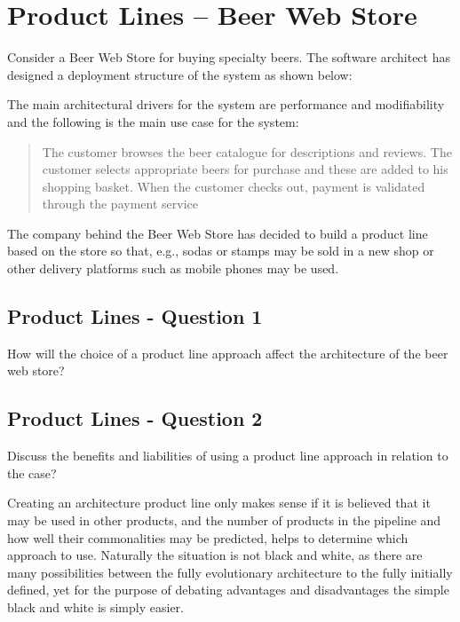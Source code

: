 \section{Product Lines -- Beer Web Store}
Consider a Beer Web Store for buying specialty beers. The software
architect has designed a deployment structure of the system as shown
below:
\begin{figure}[h!]
  \centerline{}
  \label{fig:observation}
\end{figure}
The main architectural drivers for the system are performance and
modifiability and the following is the main use case for the system:
\begin{quote}
  The customer browses the beer catalogue for descriptions and
  reviews. The customer selects appropriate beers for purchase and
  these are added to his shopping basket. When the customer checks
  out, payment is validated through the payment service
\end{quote}

The company behind the Beer Web Store has decided to build a product
line based on the store so that, e.g., sodas or stamps may be sold in
a new shop or other delivery platforms such as mobile phones may be
used.

\subsection{Product Lines - Question 1}

\begin{question}
How will the choice of a product line approach affect the
architecture of the beer web store?
\end{question}


\subsection{Product Lines - Question 2}
\label{sec:pl_q2}
\begin{question}
Discuss the benefits and liabilities of using a product line
approach in relation to the case?
\end{question}

Creating an architecture product line only makes sense if it is believed that it may be used in other products, and the number of products in the pipeline and how well their commonalities may be predicted, helps to determine which approach to use. Naturally the situation is not black and white, as there are many possibilities between the fully evolutionary architecture to the fully initially defined, yet for the purpose of debating advantages and disadvantages the simple black and white is simply easier.

